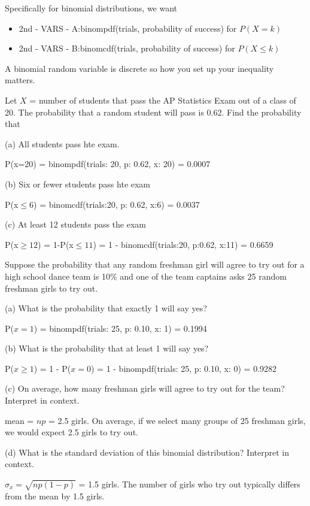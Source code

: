 \documentclass[../stats.tex]{subfiles}
\begin{document}
Specifically for binomial distributions, we want
\begin{itemize}
    \item 2nd - VARS - A:binompdf(trials, probability of success) for $P(X=k)$
    \item 2nd - VARS - B:binomcdf(trials, probability of success) for $P(X\leq k)$
\end{itemize}
A binomial random variable is discrete so how you set up your inequality matters.

\pagebreak
\begin{example}
    Let $X$ = number of students that pass the AP Statistics Exam out of a class of 20. The probability that a random student will pass is 0.62. Find the probability that 

    (a) All students pass hte exam.

    P(x=20) = binompdf(trials: 20, p: 0.62, x: 20) = 0.0007

    (b) Six or fewer students pass hte exam 

    P(x$\leq 6$) = binomcdf(trials:20, p: 0.62, x:6) = 0.0037

    (c) At least 12 students pass the exam 

    P(x$\geq 12$) = 1-P(x$\leq 11$) = 1 - binomcdf(trials:20, p:0.62, x:11) = 0.6659
\end{example}

\begin{example}
    Suppose the probability that any random freshman girl will agree to try out for a high school dance team is 10\% and one of the team captains asks 25 random freshman girls to try out.

    (a) What is the probability that exactly 1 will say yes?

    P($x=1$) = binompdf(trials: 25, p: 0.10, x: 1) = 0.1994

    (b) What is the probability that at least 1 will say yes?

    P($x\geq 1$) = 1 - P($x=0$) = 1 - binompdf(trials: 25, p: 0.10, x: 0) = 0.9282

    (c) On average, how many freshman girls will agree to try out for the team? Interpret in context.

    mean = $np$ = 2.5 girls. On average, if we select many groups of 25 freshman girls, we would expect 2.5 girls to try out.

    (d) What is the standard deviation of this binomial distribution? Interpret in context.

    $\sigma_x = \sqrt{np(1-p)}$ = 1.5 girls. The number of girls who try out typically differs from the mean by 1.5 girls.
\end{example}
\pagebreak
\end{document}

